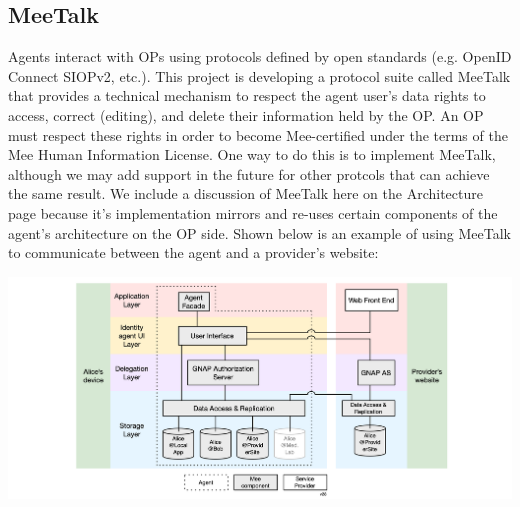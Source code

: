 \documentclass[11pt, oneside]{article}   	%
\begin{document}
\subsection{MeeTalk}

Agents interact with OPs using protocols defined by open standards (e.g. OpenID Connect SIOPv2, etc.). This project is developing a protocol suite called MeeTalk that provides a technical mechanism to respect the agent user's data rights to access, correct (editing), and delete their information held by the OP. An OP must respect these rights in order to become Mee-certified under the terms of the Mee Human Information License. One way to do this is to implement MeeTalk, although we may add support in the future for other protcols that can achieve the same result. We include a discussion of MeeTalk here on the Architecture page because it's implementation mirrors and re-uses certain components of the agent's architecture on the OP side. Shown below is an example of using MeeTalk to communicate between the agent and a provider's website:

\includegraphics[width=\textwidth]{./images/meetalk.png}
 
    


\end{document}
